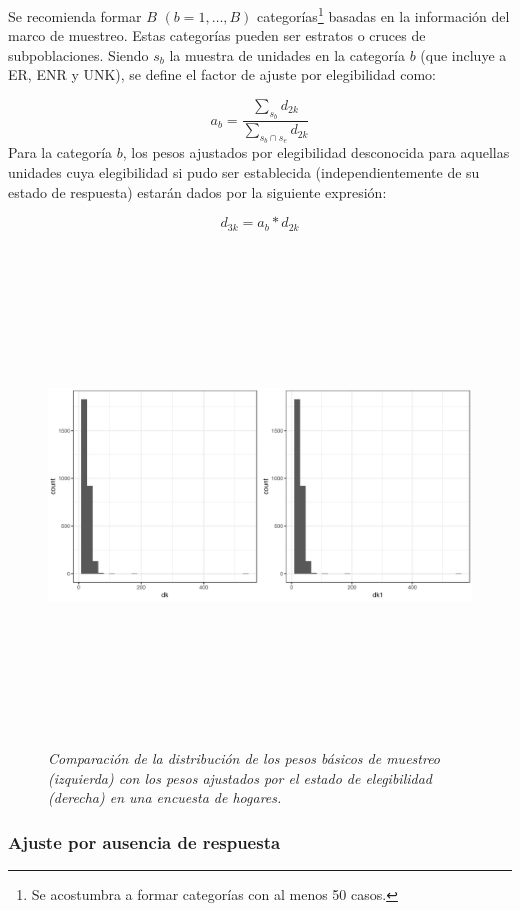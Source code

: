 \documentclass[12pt,spanish,]{book}
\let\rmarkdownfootnote\footnote%
\def\footnote{\protect\rmarkdownfootnote}
\begin{document}
Se recomienda formar \(B\) \((b = 1, \ldots, B)\) categorías\footnote{Se acostumbra a formar categorías con al menos 50 casos.} basadas en la información del marco de muestreo. Estas categorías pueden ser estratos o cruces de subpoblaciones. Siendo \(s_b\) la muestra de unidades en la categoría \(b\) (que incluye a ER, ENR y UNK), se define el factor de ajuste por elegibilidad como:

\[
a_b = \frac{\sum_{s_b}d_{2k}}{\sum_{s_b \cap s_e}d_{2k}}
\]
Para la categoría \(b\), los pesos ajustados por elegibilidad desconocida para aquellas unidades cuya elegibilidad si pudo ser establecida (independientemente de su estado de respuesta) estarán dados por la siguiente expresión:

\[
d_{3k} = a_b * d_{2k}
\]

\begin{figure}
\centering
\includegraphics[width=\textwidth,height=5.20833in]{Pics/16.png}
\caption{\emph{Comparación de la distribución de los pesos básicos de muestreo (izquierda) con los pesos ajustados por el estado de elegibilidad (derecha) en una encuesta de hogares.}}
\end{figure}

\hypertarget{ajuste-por-ausencia-de-respuesta}{%
\subsubsection*{Ajuste por ausencia de respuesta}\label{ajuste-por-ausencia-de-respuesta}}
\end{document}
